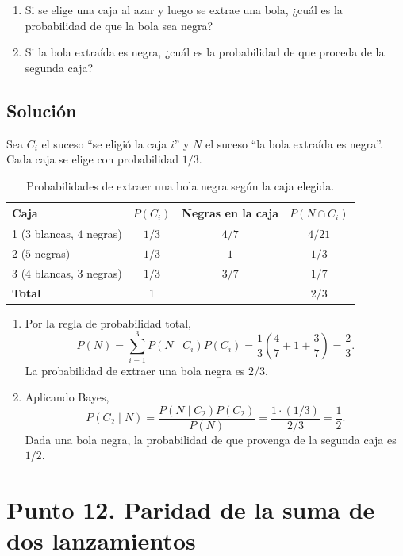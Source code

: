 \documentclass[12pt]{article}
\begin{document}
\begin{enumerate}
    \item Si se elige una caja al azar y luego se extrae una bola, ¿cuál es la probabilidad de que la bola sea negra?
    \item Si la bola extraída es negra, ¿cuál es la probabilidad de que proceda de la segunda caja?
\end{enumerate}

\subsection*{Solución}

Sea $C_i$ el suceso ``se eligió la caja $i$'' y $N$ el suceso ``la bola extraída es negra''. Cada caja se elige con probabilidad $1/3$.

\begin{table}[H]
\centering
\small
\renewcommand{\arraystretch}{1.15}
\begin{tabular}{|l|c|c|c|}
\hline
\textbf{Caja} & \textbf{$P(C_i)$} & \textbf{Negras en la caja} & \textbf{$P(N\cap C_i)$} \\ \hline
1 ($3$ blancas, $4$ negras) & $1/3$ & $4/7$ & $4/21$ \\ \hline
2 ($5$ negras) & $1/3$ & $1$ & $1/3$ \\ \hline
3 ($4$ blancas, $3$ negras) & $1/3$ & $3/7$ & $1/7$ \\ \hline
\textbf{Total} & 1 & & $2/3$ \\ \hline
\end{tabular}
\caption{Probabilidades de extraer una bola negra según la caja elegida.}
\label{tab:cajas-bolas-negras}
\end{table}

\begin{enumerate}
    \item Por la regla de probabilidad total,
    \[
    P(N)=\sum_{i=1}^{3}P(N\mid C_i)P(C_i)
    =\frac{1}{3}\left(\frac{4}{7}+1+\frac{3}{7}\right)=\frac{2}{3}.
    \]
    La probabilidad de extraer una bola negra es $2/3$.
    \item Aplicando Bayes,
    \[
    P(C_2\mid N)=\frac{P(N\mid C_2)P(C_2)}{P(N)}
    =\frac{1\cdot(1/3)}{2/3}=\frac{1}{2}.
    \]
    Dada una bola negra, la probabilidad de que provenga de la segunda caja es $1/2$.
\end{enumerate}

\section*{Punto 12. Paridad de la suma de dos lanzamientos}
\end{document}
